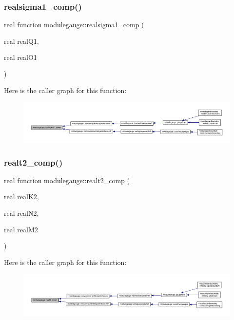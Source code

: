 \subsubsection{\texorpdfstring{realsigma1\+\_\+comp()}{realsigma1\_comp()}}
{\footnotesize\ttfamily real function modulegauge\+::realsigma1\+\_\+comp (\begin{DoxyParamCaption}\item[{real}]{real\+Q1,  }\item[{real}]{real\+O1 }\end{DoxyParamCaption})\hspace{0.3cm}{\ttfamily [private]}}

Here is the caller graph for this function\+:\nopagebreak
\begin{figure}[H]
\begin{center}
\leavevmode
\includegraphics[width=350pt]{namespacemodulegauge_a639e6e7756ddc09a7f1410460b232db1_icgraph}
\end{center}
\end{figure}
\mbox{\label{namespacemodulegauge_a5708a7eceb753eedf87d41d40a3a619a}} 
\subsubsection{\texorpdfstring{realt2\+\_\+comp()}{realt2\_comp()}}
{\footnotesize\ttfamily real function modulegauge\+::realt2\+\_\+comp (\begin{DoxyParamCaption}\item[{real}]{real\+K2,  }\item[{real}]{real\+N2,  }\item[{real}]{real\+M2 }\end{DoxyParamCaption})\hspace{0.3cm}{\ttfamily [private]}}

Here is the caller graph for this function\+:\nopagebreak
\begin{figure}[H]
\begin{center}
\leavevmode
\includegraphics[width=350pt]{namespacemodulegauge_a5708a7eceb753eedf87d41d40a3a619a_icgraph}
\end{center}
\end{figure}
\mbox{\label{namespacemodulegauge_ad2e8899353e8c890c82e852038be05f9}} 
